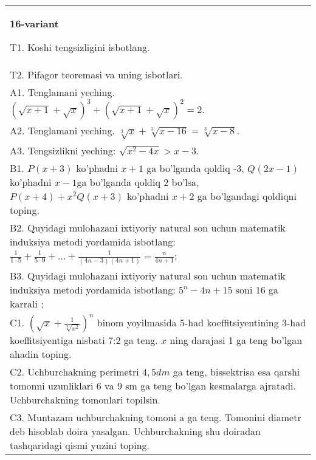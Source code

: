 \documentclass{article}
\begin{document}
\begin{tabular}{m{17cm}}
\textbf{16-variant}
\newline

T1. Koshi tengsizligini isbotlang. \\
T2. Pifagor teoremasi va uning isbotlari. \\
A1. Tenglamani yeching. \((\sqrt{x + 1} + \sqrt{x})^{3} + (\sqrt{x + 1} + \sqrt{x})^{2} = 2\). \\
A2. Tenglamani yeching. \(\sqrt[3]{x} + \sqrt[3]{x - 16} = \sqrt[3]{x - 8}\). \\
A3. Tengsizlikni yeching: \(\sqrt{x^{2} - 4x} > x - 3\). \\
B1. \(P(x + 3)\) ko'phadni \(x + 1\) ga bo'lganda qoldiq -3, \(Q(2x - 1)\) ko'phadni \(x - 1\)ga bo'lganda qoldiq 2 bo'lsa, \(P(x + 4) + x^{2}Q(x + 3)\) ko'phadni \(x + 2\) ga bo'lgandagi qoldiqni toping. \\
B2. Quyidagi mulohazani ixtiyoriy natural son uchun matematik induksiya metodi yordamida isbotlang: \(\frac{1}{1 \cdot 5} + \frac{1}{5 \cdot 9} + ... + \frac{1}{(4n - 3)(4n + 1)} = \frac{n}{4n + 1}\); \\
B3. Quyidagi mulohazani ixtiyoriy natural son uchun matematik induksiya metodi yordamida isbotlang: \(5^{n} - 4n + 15\) soni 16 ga karrali ; \\
C1. \(\left( \sqrt{x} + \frac{1}{\sqrt[3]{x^{2}}} \right)^{n}\) binom yoyilmasida 5-had koeffitsiyentining 3-had koeffitsiyentiga nisbati 7:2 ga teng. \(x\) ning darajasi 1 ga teng bo'lgan ahadin toping. \\
C2. Uchburchakning perimetri \(4,5dm\) ga teng, bissektrisa esa qarshi tomonni uzunliklari 6 va 9 sm ga teng bo'lgan kesmalarga ajratadi. Uchburchakning tomonlari topilsin. \\
C3. Muntazam uchburchakning tomoni a ga teng. Tomonini diametr deb hisoblab doira yasalgan. Uchburchakning shu doiradan tashqaridagi qismi yuzini toping. \\

\end{tabular}
\vspace{1cm}
\end{document}
